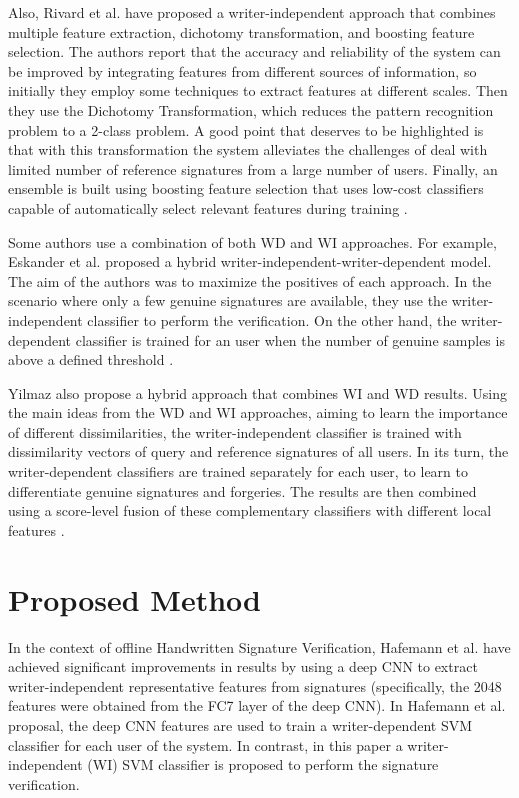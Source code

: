 \documentclass[conference]{IEEEtran}
\begin{document}
Also, Rivard et al. \cite{rivard:13} have proposed a  writer-independent approach that combines multiple feature extraction, dichotomy transformation, and boosting feature selection. The authors report that the accuracy and reliability of the system can be improved by integrating features from different sources of information, so initially they employ some techniques to extract features at different scales. Then they use the Dichotomy Transformation, which reduces the pattern recognition problem to a 2-class problem. 
A good point that deserves to be highlighted is that with this transformation the system alleviates the challenges of deal with limited number of reference signatures from a large number of users. Finally, an ensemble is built using boosting feature selection that uses low-cost classifiers capable of automatically select relevant features during training \cite{rivard:13}. 

Some authors use a combination of both WD and WI approaches. For
example, Eskander et al. \cite{eskander:13} proposed a hybrid writer-independent-writer-dependent model. The aim of the authors was to maximize the positives of each approach. In the scenario where only a few genuine signatures are available, they use the writer-independent classifier to perform the verification. On the other hand, the writer-dependent classifier is trained for an user when the number of genuine samples is above a defined threshold \cite{eskander:13}.

Yilmaz \cite{yilmaz:16} also propose a hybrid approach that combines WI and WD results. Using the main ideas from the WD and WI approaches, aiming to learn the importance of different dissimilarities, the writer-independent classifier is trained with dissimilarity vectors of query and reference signatures of all users. In its turn, the writer-dependent classifiers are trained separately for each user, to learn to differentiate genuine signatures and forgeries. The results are then combined using a score-level fusion of these complementary classifiers with different local features \cite{yilmaz:16}.

\section{Proposed Method}
\label{sec:proposed_method}

In the context of offline Handwritten Signature Verification, Hafemann et al. \cite{hafemann:17} have achieved significant improvements in results by using a deep CNN to extract writer-independent representative features from signatures (specifically, the 2048 features were obtained from the FC7 layer of the deep CNN). In  Hafemann et al. proposal, the deep CNN features are  used to train a writer-dependent SVM classifier for each user of the system. In contrast, in this paper a writer-independent (WI) SVM classifier is proposed to perform the signature verification.
\end{document}
